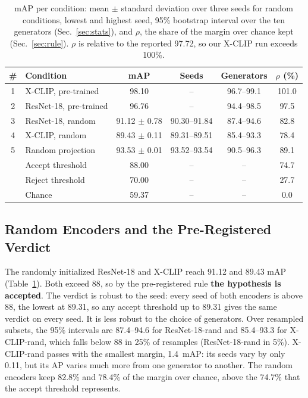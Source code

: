 \documentclass[conference]{IEEEtran}
\begin{document}
\begin{table}[t]
\caption{mAP per condition: mean $\pm$ standard deviation over three seeds
for random conditions, lowest and highest seed, 95\% bootstrap interval over
the ten generators (Sec.~\ref{sec:stats}), and $\rho$, the share of the margin
over chance kept (Sec.~\ref{sec:rule}). $\rho$ is relative to the reported
97.72, so our X-CLIP run exceeds 100\%.}
\label{tab:summary}
\centering
\footnotesize
\setlength{\tabcolsep}{2pt}
\begin{tabular}{@{}clcccc@{}}
\toprule
\# & Condition & mAP & Seeds & Generators & $\rho$ (\%) \\
\midrule
1 & X-CLIP, pre-trained    & 98.10            & --           & 96.7--99.1 & 101.0 \\
2 & ResNet-18, pre-trained & 96.76            & --           & 94.4--98.5 & 97.5 \\
3 & ResNet-18, random      & 91.12 $\pm$ 0.78 & 90.30--91.84 & 87.4--94.6 & 82.8 \\
4 & X-CLIP, random         & 89.43 $\pm$ 0.11 & 89.31--89.51 & 85.4--93.3 & 78.4 \\
5 & Random projection      & 93.53 $\pm$ 0.01 & 93.52--93.54 & 90.5--96.3 & 89.1 \\
\midrule
  & Accept threshold       & 88.00            & --           & --         & 74.7 \\
  & Reject threshold       & 70.00            & --           & --         & 27.7 \\
  & Chance                 & 59.37           & --           & --         & 0.0 \\
\bottomrule
\end{tabular}
\end{table}

\subsection{Random Encoders and the Pre-Registered Verdict}

The randomly initialized ResNet-18 and X-CLIP reach 91.12 and 89.43 mAP
(Table~\ref{tab:summary}). Both exceed 88, so by the pre-registered rule
\textbf{the hypothesis is accepted}. The verdict is robust to the seed: every
seed of both encoders is above 88, the lowest at 89.31, so any accept
threshold up to 89.31 gives the same verdict on every seed. It is less robust
to the choice of generators. Over resampled subsets, the 95\% intervals are
87.4--94.6 for ResNet-18-rand and 85.4--93.3 for X-CLIP-rand, which falls
below 88 in 25\% of resamples (ResNet-18-rand in 5\%). X-CLIP-rand passes with
the smallest margin, 1.4~mAP: its seeds vary by only 0.11, but its AP varies
much more from one generator to another. The random encoders keep 82.8\% and
78.4\% of the margin over chance, above the 74.7\% that the accept threshold
represents.
\end{document}
